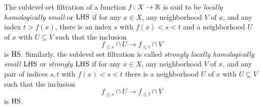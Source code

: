 


%

\begin{defi} \label{defi:local_connectedness_filtrations}
	The sublevel set filtration of a function $f \colon X \to \mathbb{R}$ is said to be \emph{locally homologically small} or $\mathrm{LHS}$ 
	if for any $x \in X$, any neighborhood $V$ of $x$, and any index $t > f(x)$, there is an index $s$ with  $f(x) < s < t$ and a neighborhood $U$ of $x$ with $U \subseteq V$ such that the inclusion
	\begin{equation*}
	f_{\leq s} \cap U \to f_{\leq t} \cap V
	\end{equation*}
	is $\mathrm{HS}$.
	Similarly, the sublevel set filtration is called \emph{strongly locally homologically small $\mathrm{LHS}$} or \emph{strongly $\mathrm{LHS}$} if for any $x \in X$, any neighborhood $V$ of $x$, and any pair of indices $s,t$ with $f(x) < s < t$ there is a neighborhood $U$ of $x$ with $U \subseteq V$ such that the inclusion
	\begin{equation*}
	f_{\leq s} \cap U \to f_{\leq t} \cap V
	\end{equation*}
	is $\mathrm{HS}$.
\end{defi}

